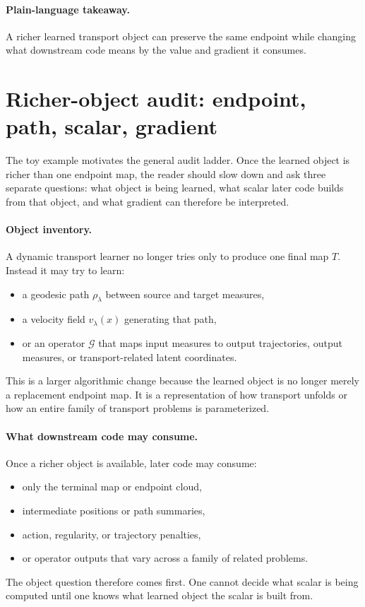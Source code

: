 \paragraph{Plain-language takeaway.}
A richer learned transport object can preserve the same endpoint while changing
what downstream code means by the value and gradient it consumes.

\section{Richer-object audit: endpoint, path, scalar, gradient}
\label{sec:bf-neural-ot-dynamic-object}
\label{sec:bf-neural-ot-dynamic-same-scalar}

The toy example motivates the general audit ladder.  Once the learned object is
richer than one endpoint map, the reader should slow down and ask three separate
questions: what object is being learned, what scalar later code builds from that
object, and what gradient can therefore be interpreted.

\paragraph{Object inventory.}
A dynamic transport learner no longer tries only to produce one final map
\(T\).  Instead it may try to learn:
\begin{itemize}
  \item a geodesic path \(\rho_\lambda\) between source and target measures,
  \item a velocity field \(v_\lambda(x)\) generating that path,
  \item or an operator \(\mathcal G\) that maps input measures to output
  trajectories, output measures, or transport-related latent coordinates.
\end{itemize}
This is a larger algorithmic change because the learned object is no longer merely
a replacement endpoint map.  It is a representation of how transport unfolds or
how an entire family of transport problems is parameterized.

\paragraph{What downstream code may consume.}
Once a richer object is available, later code may consume:
\begin{itemize}
  \item only the terminal map or endpoint cloud,
  \item intermediate positions or path summaries,
  \item action, regularity, or trajectory penalties,
  \item or operator outputs that vary across a family of related problems.
\end{itemize}
The object question therefore comes first.  One cannot decide what scalar is being
computed until one knows what learned object the scalar is built from.

